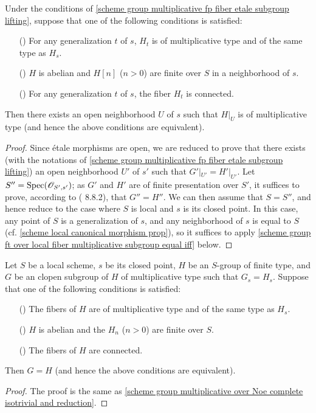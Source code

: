 \begin{corollary}\label{scheme group multiplicative fp fiber extend to nbhd}
Under the conditions of \cref{scheme group multiplicative fp fiber etale subgroup lifting}, suppose that one of the following conditions is satisfied:
\begin{enumerate}
    \item[(\rmnum{1})] For any generalization $t$ of $s$, $H_t$ is of multiplicative type and of the same type as $H_s$.
    \item[(\rmnum{2})] $H$ is abelian and $H[n]$ ($n>0$) are finite over $S$ in a neighborhood of $s$.
    \item[(\rmnum{3})] For any generalization $t$ of $s$, the fiber $H_t$ is connected.
\end{enumerate}
Then there exists an open neighborhood $U$ of $s$ such that $H|_U$ is of multiplicative type (and hence the above conditions are equivalent).
\end{corollary}
\begin{proof}
Since \'etale morphisms are open, we are reduced to prove that there exists (with the notations of \cref{scheme group multiplicative fp fiber etale subgroup lifting}) an open neighborhood $U'$ of $s'$ such that $G'|_{U'}=H'|_{U'}$. Let $S''=\mathrm{Spec}(\mathscr{O}_{S',s'})$; as $G'$ and $H'$ are of finite presentation over $S'$, it suffices to prove, according to (\cite{EGA4-3} 8.8.2), that $G''=H''$. We can then assume that $S=S''$, and hence reduce to the case where $S$ is local and $s$ is its closed point. In this case, any point of $S$ is a generalization of $s$, and any neighborhood of $s$ is equal to $S$ (cf. \cref{scheme local canonical morphism prop}), so it suffices to apply \cref{scheme group ft over local fiber multiplicative subgroup equal iff} below.
\end{proof}

\begin{lemma}\label{scheme group ft over local fiber multiplicative subgroup equal iff}
Let $S$ be a local scheme, $s$ be its closed point, $H$ be an $S$-group of finite type, and $G$ be an clopen subgroup of $H$ of multiplicative type such that $G_s=H_s$. Suppose that one of the following conditions is satisfied:
\begin{enumerate}
    \item[(\rmnum{1})] The fibers of $H$ are of multiplicative type and of the same type as $H_s$.
    \item[(\rmnum{2})] $H$ is abelian and the $H_n$ ($n>0$) are finite over $S$.
    \item[(\rmnum{3})] The fibers of $H$ are connected.
\end{enumerate}
Then $G=H$ (and hence the above conditions are equivalent).
\end{lemma}
\begin{proof}
The proof is the same as \cref{scheme group multiplicative over Noe complete isotrivial and reduction}.
\end{proof}

